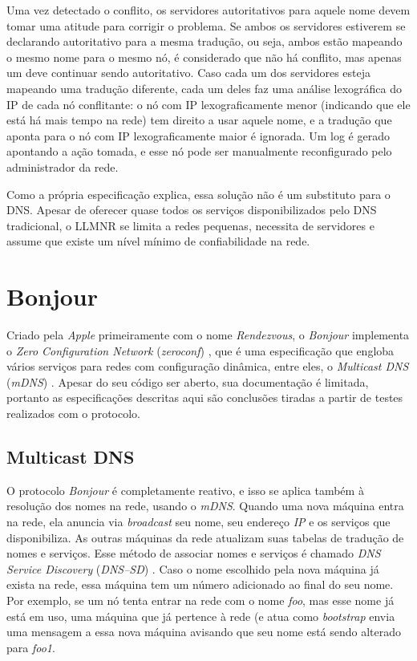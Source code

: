     Uma vez detectado o conflito, os servidores autoritativos para aquele nome
    devem tomar uma atitude para corrigir o problema. Se ambos os servidores
    estiverem se declarando autoritativo para a mesma tradução, ou seja, ambos
    estão mapeando o mesmo nome para o mesmo nó, é considerado que não há conflito,
    mas apenas um deve continuar sendo autoritativo. Caso cada um dos servidores
    esteja mapeando uma tradução diferente, cada um deles faz uma análise lexográfica
    do IP de cada nó conflitante: o nó com IP lexograficamente menor (indicando
    que ele está há mais tempo na rede) tem direito a usar aquele nome, e a
    tradução que aponta para o nó com IP lexograficamente maior é ignorada. Um log
    é gerado apontando a ação tomada, e esse nó pode ser manualmente reconfigurado
    pelo administrador da rede.
    
    Como a própria especificação explica, essa solução não é um substituto para
    o DNS. Apesar de oferecer quase todos os serviços disponibilizados pelo DNS
    tradicional, o LLMNR se limita a redes pequenas, necessita de servidores e
    assume que existe um nível mínimo de confiabilidade na rede.

\section{Bonjour}
\label{Bonjour}

    Criado pela \textit{Apple} primeiramente com o nome \textit{Rendezvous}, o 
    \textit{Bonjour} implementa o \textit{Zero Configuration Network} 
    (\textit{zeroconf}) \cite{zeroconf}, que é uma especificação que engloba vários
    serviços para redes com configuração dinâmica, entre eles, o 
    \textit{Multicast DNS} (\textit{mDNS}) \cite{mdns}. Apesar do seu código ser 
    aberto, sua documentação é limitada, portanto as especificações descritas aqui
    são conclusões tiradas a partir de testes realizados com o protocolo.
  
    \subsection{Multicast DNS}
    \label{MDNS}
  
        O protocolo \textit{Bonjour} é completamente reativo, e isso se aplica também
        à resolução dos nomes na rede, usando o \textit{mDNS}. Quando uma nova máquina
        entra na rede, ela anuncia via \textit{broadcast} seu nome, seu endereço 
        \emph{IP} e os serviços que disponibiliza. As outras máquinas da rede 
        atualizam suas tabelas de tradução de nomes e serviços. Esse método de 
        associar nomes e serviços é chamado \textit{DNS Service Discovery} 
        (\textit{DNS--SD}) \cite{dnssd}. Caso o nome escolhido pela nova máquina 
        já exista na rede, essa máquina tem um número adicionado ao final do seu 
        nome. Por exemplo, se um nó tenta entrar na rede com o nome \emph{foo}, mas
        esse nome já está em uso, uma máquina que já pertence à rede (e atua como
		\textit{bootstrap} envia uma mensagem a essa nova máquina avisando que seu
		nome está sendo alterado para \emph{foo1}.

